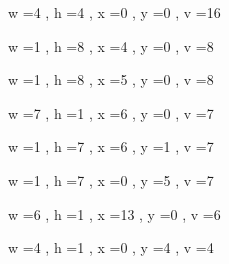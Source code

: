 \documentclass[11pt]{article}
\begin{document}
w =4 , h =4 , x =0 , y =0 , v =16
\par
w =1 , h =8 , x =4 , y =0 , v =8
\par
w =1 , h =8 , x =5 , y =0 , v =8
\par
w =7 , h =1 , x =6 , y =0 , v =7
\par
w =1 , h =7 , x =6 , y =1 , v =7
\par
w =1 , h =7 , x =0 , y =5 , v =7
\par
w =6 , h =1 , x =13 , y =0 , v =6
\par
w =4 , h =1 , x =0 , y =4 , v =4
\par
\newpage
\end{document}
